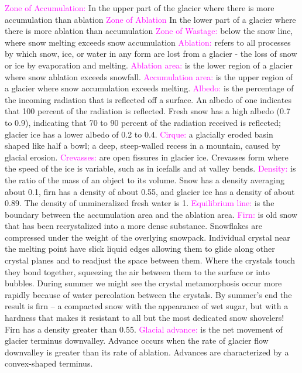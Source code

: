 \documentclass{article}
\newcommand{\pink}[1]{\textcolor{magenta}{#1}}
\newcommand{\vocab}[1]{{\pink{#1}}}
\begin{document}
\begin{multicols*}{4}
		\vocab{Zone of Accumulation: } In the upper part of the glacier where there is more accumulation than ablation  
		\vocab{Zone of Ablation} In the lower part of a glacier where there is more ablation than accumulation  
		\vocab{Zone of Wastage: } below the snow line, where snow melting exceeds snow accumulation
		\vocab{Ablation:} refers to all processes by which snow, ice, or water in any form are lost from a glacier - the loss of snow or ice by evaporation and melting.
		\vocab{Ablation area:} is the lower region of a glacier where snow ablation exceeds snowfall.
		\vocab{Accumulation area:} is the upper region of a glacier where snow accumulation exceeds melting.
		\vocab{Albedo: }is the percentage of the incoming radiation that is reflected off a surface. An albedo of one indicates that 100 percent of the radiation is reflected. Fresh snow has a high albedo (0.7 to 0.9), indicating that 70 to 90 percent of the radiation received is reflected; glacier ice has a lower albedo of 0.2 to 0.4.
		\vocab{Cirque:} a glacially eroded basin shaped like half a bowl; a deep, steep-walled recess in a mountain, caused by glacial erosion.
		\vocab{Crevasses: }are open fissures in glacier ice. Crevasses form where the speed of the ice is variable, such as in icefalls and at valley bends.
		\vocab{Density:} is the ratio of the mass of an object to its volume. Snow has a density averaging about 0.1, firn has a density of about 0.55, and glacier ice has a density of about 0.89. The density of unmineralized fresh water is 1.
		\vocab{Equilibrium line:} is the boundary between the accumulation area and the ablation area.
		\vocab{Firn: }is old snow that has been recrystalized into a more dense substance. Snowflakes are compressed under the weight of the overlying snowpack. Individual crystal near the melting point have slick liquid edges allowing them to glide along other crystal planes and to readjust the space between them. Where the crystals touch they bond together, squeezing the air between them to the surface or into bubbles. During summer we might see the crystal metamorphosis occur more rapidly because of water percolation between the crystals. By summer's end the result is firn -- a compacted snow with the appearance of wet sugar, but with a hardness that makes it resistant to all but the most dedicated snow shovelers! Firn has a density greater than 0.55.
		\vocab{Glacial advance:} is the net movement of glacier terminus downvalley. Advance occurs when the rate of glacier flow downvalley is greater than its rate of ablation. Advances are characterized by a convex-shaped terminus.

\end{multicols*}
\end{document}
